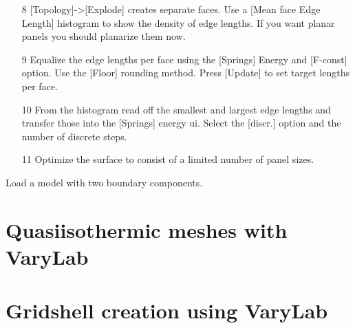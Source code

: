 \documentclass[Thesis.tex]{subfiles}
\begin{document}
\begin{itemize}
\item[8] [Topology]->[Explode] creates separate faces. Use a [Mean face Edge Length] histogram to show the density of edge lengths. If you want planar panels you should planarize them now. 
\item[9] Equalize the edge lengths per face using the [Springs] Energy and [F-const] option. Use the [Floor] rounding method. Press [Update] to set target lengths per face.
\item[10] From the histogram read off the smallest and largest edge lengths and transfer those into the [Springs] energy ui. Select the [discr.] option and the number of discrete steps.
\item[11] Optimize the surface to consist of a limited number of panel sizes.
\end{itemize}


Load a model with two boundary components. 

\section{Quasiisothermic meshes with {\sc VaryLab}}

\section{Gridshell creation using {\sc VaryLab}}

\subfilebibliography
\end{document}
